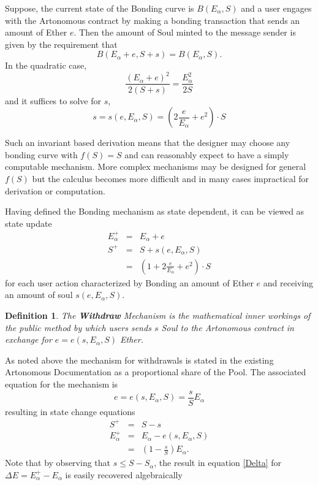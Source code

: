 \documentclass[11pt]{amsart}
\newtheorem{definition}{Definition}
\begin{document}
Suppose, the current state of the Bonding curve is $B(E_\alpha, S)$ and a user engages with the Artonomous contract by making a bonding transaction that sends an amount of Ether $e$. Then the amount of Soul minted to the message sender is given by the requirement that
\begin{equation}
B(E_\alpha+e, S+s) = B(E_\alpha, S).
\end{equation} 
In the quadratic case,
\begin{equation}
\frac{(E_\alpha+e)^2}{2(S+s)} = \frac{E_\alpha^2}{2S}
\end{equation} 
and it suffices to solve for $s$,
\begin{equation}
s = s(e,E_\alpha, S) = \left(2\frac{e}{E_\alpha}+e^2\right)\cdot S \label{bond}
\end{equation}

Such an invariant based derivation means that the designer may choose any bonding curve with $f(S)=S$ and can reasonably expect to have a simply computable mechanism. More complex mechanisms may be designed for general $f(S)$ but the calculus becomes more difficult and in many cases impractical for derivation or computation.

Having defined the Bonding mechanism as state dependent, it can be viewed as state update
\begin{eqnarray}
E_\alpha^+ &=& E_\alpha + e \\
S^+ &=& S+s(e,E_\alpha, S)\\
&=&  \left(1+2\frac{e}{E_\alpha}+e^2\right)\cdot S
\end{eqnarray}
for each user action characterized by Bonding an amount of Ether $e$ and receiving an amount of soul $s(e,E_\alpha, S)$.

\begin{definition}
The \textbf{Withdraw} Mechanism is the mathematical inner workings of the public method by which users sends $s$ Soul to the Artonomous contract in exchange for $e=e(s,E_\alpha, S)$ Ether. 
\end{definition}

As noted above the mechanism for withdrawals is stated in the existing Artonomous Documentation as a proportional share of the Pool. The associated equation for the mechanism is
\begin{equation}
e=e(s,E_\alpha, S) = \frac{s}{S} E_\alpha \label{withdraw}
\end{equation}
resulting in state change equations
\begin{eqnarray}
S^+ &=& S-s\\
E_\alpha^+ &=& E_\alpha - e(s,E_\alpha, S)\\
&=& \left(1-\frac{s}{S}\right) E_\alpha.
\end{eqnarray}
Note that by observing that $s\le S-S_\alpha$, the result in equation \eqref{Delta} for $\Delta E = E^+_\alpha - E_\alpha$ is easily recovered algebraically
\end{document}
